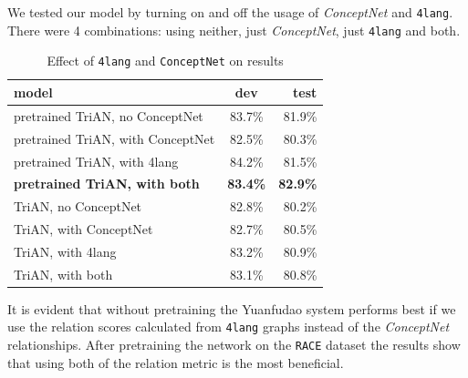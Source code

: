 We tested our model by turning on and off the usage of \textit{ConceptNet} and \texttt{4lang}. There were 4 combinations: using neither, just \textit{ConceptNet}, just \texttt{4lang} and both.

\begin{table}[h!]
	\centering
	\begin{tabular}{ | l | c | r | }
		\hline
		model & dev & test \\ \hline \hline
		pretrained TriAN, no ConceptNet & 83.7\% & 81.9\% \\ \hline
		pretrained TriAN, with ConceptNet & 82.5\% & 80.3\% \\ \hline
		pretrained TriAN, with 4lang & 84.2\% & 81.5\% \\ \hline
		\textbf{pretrained TriAN, with both} & \textbf{83.4\%} & \textbf{82.9\%} \\ \hline
		TriAN, no ConceptNet & 82.8\% & 80.2\% \\ \hline
		TriAN, with ConceptNet & 82.7\% & 80.5\% \\ \hline
		TriAN, with 4lang & 83.2\% & 80.9\% \\ \hline
		TriAN, with both & 83.1\% & 80.8\% \\ \hline
	\end{tabular}
	\caption{Effect of \texttt{4lang} and \texttt{ConceptNet} on results}
	\label{tabl:res}
\end{table}

It is evident that without pretraining the Yuanfudao system performs best if we use the relation scores calculated from \texttt{4lang} graphs instead of the \textit{ConceptNet} relationships.
After pretraining the network on the \texttt{RACE} dataset the results show that using both of the relation metric is the most beneficial.